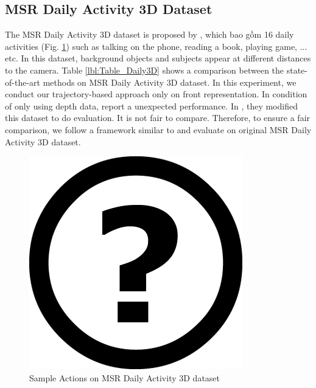 \documentclass[review]{elsarticle}
\begin{document}
\subsection{MSR Daily Activity 3D Dataset}

 The  MSR Daily Activity 3D dataset is proposed by \cite{wang2012mining}, which bao gồm 16 daily activities  (Fig. \ref{lbl:Figure_MSRDaily3D}) such as talking on the phone, reading a book, playing game, ... etc. In this dataset, background objects and subjects appear at different distances to the camera. Table \ref{lbl:Table_Daily3D} shows a comparison between the state-of-the-art methods on MSR Daily Activity 3D dataset. In this experiment, we conduct our trajectory-based approach only on front representation. In condition of only using depth data, \cite{wang2012mining, oreifej2013hon4d, xia2013spatio} report a unexpected performance. In \cite{xia2013spatio}, they modified this dataset to do evaluation. It is not fair to compare. Therefore, to ensure a fair comparison, we follow a framework similar to \cite{xia2013spatio} and evaluate on original MSR Daily Activity 3D dataset.

\begin{figure}[H]
	\begin{center}
		\includegraphics[scale=0.5]{Unknown.png}
	\end{center}
	\caption{\label{lbl:Figure_MSRDaily3D}Sample Actions on MSR Daily Activity 3D dataset}
\end{figure}
\end{document}
